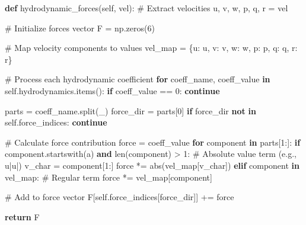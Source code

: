 \documentclass[
  letterpaper,
  DIV=11,
  numbers=noendperiod]{scrreprt}
\newenvironment{Shaded}{\begin{snugshade}}{\end{snugshade}}
\newcommand{\BuiltInTok}[1]{\textcolor[rgb]{0.00,0.23,0.31}{#1}}
\newcommand{\CommentTok}[1]{\textcolor[rgb]{0.37,0.37,0.37}{#1}}
\newcommand{\ControlFlowTok}[1]{\textcolor[rgb]{0.00,0.23,0.31}{\textbf{#1}}}
\newcommand{\DecValTok}[1]{\textcolor[rgb]{0.68,0.00,0.00}{#1}}
\newcommand{\KeywordTok}[1]{\textcolor[rgb]{0.00,0.23,0.31}{\textbf{#1}}}
\newcommand{\NormalTok}[1]{\textcolor[rgb]{0.00,0.23,0.31}{#1}}
\newcommand{\OperatorTok}[1]{\textcolor[rgb]{0.37,0.37,0.37}{#1}}
\newcommand{\StringTok}[1]{\textcolor[rgb]{0.13,0.47,0.30}{#1}}
\newcommand{\VariableTok}[1]{\textcolor[rgb]{0.07,0.07,0.07}{#1}}
\begin{document}
\begin{Shaded}
\begin{Highlighting}[]
\KeywordTok{def}\NormalTok{ hydrodynamic\_forces(}\VariableTok{self}\NormalTok{, vel):}
    \CommentTok{\# Extract velocities}
\NormalTok{    u, v, w, p, q, r }\OperatorTok{=}\NormalTok{ vel}
    
    \CommentTok{\# Initialize forces vector}
\NormalTok{    F }\OperatorTok{=}\NormalTok{ np.zeros(}\DecValTok{6}\NormalTok{)}
    
    \CommentTok{\# Map velocity components to values}
\NormalTok{    vel\_map }\OperatorTok{=}\NormalTok{ \{}\StringTok{\textquotesingle{}u\textquotesingle{}}\NormalTok{: u, }\StringTok{\textquotesingle{}v\textquotesingle{}}\NormalTok{: v, }\StringTok{\textquotesingle{}w\textquotesingle{}}\NormalTok{: w, }\StringTok{\textquotesingle{}p\textquotesingle{}}\NormalTok{: p, }\StringTok{\textquotesingle{}q\textquotesingle{}}\NormalTok{: q, }\StringTok{\textquotesingle{}r\textquotesingle{}}\NormalTok{: r\}}
    
    \CommentTok{\# Process each hydrodynamic coefficient}
    \ControlFlowTok{for}\NormalTok{ coeff\_name, coeff\_value }\KeywordTok{in} \VariableTok{self}\NormalTok{.hydrodynamics.items():}
        \ControlFlowTok{if}\NormalTok{ coeff\_value }\OperatorTok{==} \DecValTok{0}\NormalTok{: }\ControlFlowTok{continue}
        
\NormalTok{        parts }\OperatorTok{=}\NormalTok{ coeff\_name.split(}\StringTok{\textquotesingle{}\_\textquotesingle{}}\NormalTok{)}
\NormalTok{        force\_dir }\OperatorTok{=}\NormalTok{ parts[}\DecValTok{0}\NormalTok{]}
        \ControlFlowTok{if}\NormalTok{ force\_dir }\KeywordTok{not} \KeywordTok{in} \VariableTok{self}\NormalTok{.force\_indices: }\ControlFlowTok{continue}
        
        \CommentTok{\# Calculate force contribution}
\NormalTok{        force }\OperatorTok{=}\NormalTok{ coeff\_value}
        \ControlFlowTok{for}\NormalTok{ component }\KeywordTok{in}\NormalTok{ parts[}\DecValTok{1}\NormalTok{:]:}
            \ControlFlowTok{if}\NormalTok{ component.startswith(}\StringTok{\textquotesingle{}a\textquotesingle{}}\NormalTok{) }\KeywordTok{and} \BuiltInTok{len}\NormalTok{(component) }\OperatorTok{\textgreater{}} \DecValTok{1}\NormalTok{:}
                \CommentTok{\# Absolute value term (e.g., u|u|)}
\NormalTok{                v\_char }\OperatorTok{=}\NormalTok{ component[}\DecValTok{1}\NormalTok{:]}
\NormalTok{                force }\OperatorTok{*=} \BuiltInTok{abs}\NormalTok{(vel\_map[v\_char])}
            \ControlFlowTok{elif}\NormalTok{ component }\KeywordTok{in}\NormalTok{ vel\_map:}
                \CommentTok{\# Regular term}
\NormalTok{                force }\OperatorTok{*=}\NormalTok{ vel\_map[component]}
                
        \CommentTok{\# Add to force vector}
\NormalTok{        F[}\VariableTok{self}\NormalTok{.force\_indices[force\_dir]] }\OperatorTok{+=}\NormalTok{ force}
        
    \ControlFlowTok{return}\NormalTok{ F}
\end{Highlighting}
\end{Shaded}
\end{document}
